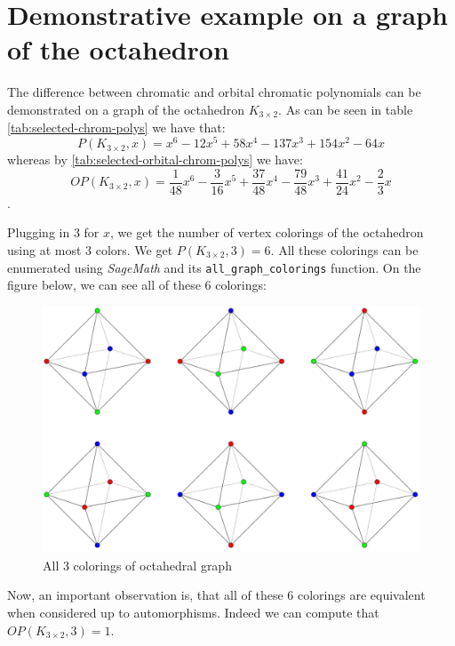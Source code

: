 \section{Demonstrative example on a graph of the octahedron}

The difference between chromatic and orbital chromatic polynomials can be demonstrated on a graph of the octahedron $K_{3 \times 2}$. As can be seen in table \ref{tab:selected-chrom-polys} we have that: $$P(K_{3 \times 2},x) = x^{6} - 12x^{5} + 58x^{4} - 137x^{3} + 154x^{2} - 64x$$ whereas by \ref{tab:selected-orbital-chrom-polys} 
 we have: $$OP(K_{3 \times 2},x) = \frac{1}{48}x^{6} - \frac{3}{16}x^{5} + \frac{37}{48}x^{4} - \frac{79}{48}x^{3} + \frac{41}{24}x^{2} - \frac{2}{3}x$$.

Plugging in $3$ for $x$, we get the number of vertex colorings of the octahedron using at most $3$ colors. We get $P(K_{3 \times 2},3) = 6$. All these colorings can be enumerated using \textit{SageMath} \cite{sagemath} and its \verb|all_graph_colorings| function. On the figure below, we can see all of these $6$ colorings:

\begin{figure}[H]
    \centering
    \includegraphics[width=1\textwidth]{../Resources/Figs/octahedron_3-clrings.pdf}
    \caption{All 3 colorings of octahedral graph}
    \label{fig:octahedron-3-clrings}
\end{figure}

Now, an important observation is, that all of these $6$ colorings are equivalent when considered up to automorphisms. Indeed we can compute that $OP(K_{3 \times 2},3) = 1$.

